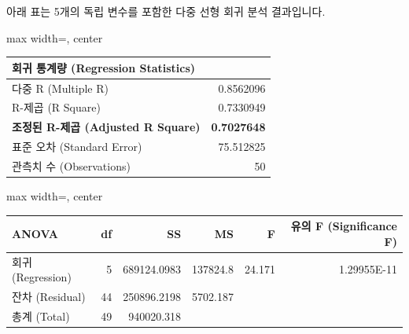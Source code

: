 \documentclass[11pt,a4paper]{article}
\theoremstyle{definition}
\begin{document}
\begin{tcolorbox}[title=\textbf{Excel 출력: 다중 선형 회귀 분석 (초기 모델)}]
아래 표는 5개의 독립 변수를 포함한 다중 선형 회귀 분석 결과입니다.

\begin{adjustbox}{max width=\textwidth, center}
\begin{tabular}{l r}
\toprule
\textbf{회귀 통계량 (Regression Statistics)} & \\
\midrule
다중 R (Multiple R) & 0.8562096 \\
R-제곱 (R Square) & 0.7330949 \\
\textbf{조정된 R-제곱 (Adjusted R Square)} & \textbf{0.7027648} \\
표준 오차 (Standard Error) & 75.512825 \\
관측치 수 (Observations) & 50 \\
\bottomrule
\end{tabular}
\end{adjustbox}

\vspace{0.5em}

\begin{adjustbox}{max width=\textwidth, center}
\begin{tabular}{l r r r r r}
\toprule
\textbf{ANOVA} & \textbf{df} & \textbf{SS} & \textbf{MS} & \textbf{F} & \textbf{유의 F (Significance F)} \\
\midrule
회귀 (Regression) & 5 & 689124.0983 & 137824.8 & 24.171 & 1.29955E-11 \\
잔차 (Residual) & 44 & 250896.2198 & 5702.187 & & \\
총계 (Total) & 49 & 940020.318 & & & \\
\bottomrule
\end{tabular}
\end{adjustbox}

\vspace{0.5em}


\end{tcolorbox}
\end{document}
